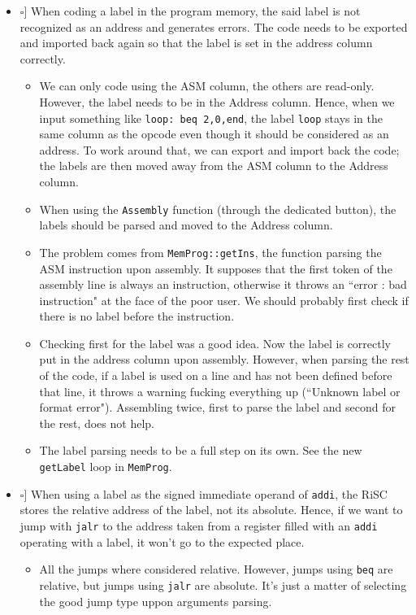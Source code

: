 \documentclass[12pt,a4paper]{extarticle}
\newcommand{\done}{\makebox[0pt][l]{$\square$}\raisebox{.15ex}{\hspace{0.1em}$\checkmark$}}%
\begin{document}
\begin{itemize}
  \item[\done] When coding a label in the program memory, the said label is not recognized as an address and generates errors.
  The code needs to be exported and imported back again so that the label is set in the address column correctly.
  \begin{itemize}
    \item We can only code using the ASM column, the others are read-only.
    However, the label needs to be in the Address column.
    Hence, when we input something like \texttt{loop: beq 2,0,end}, the label \texttt{loop} stays in the same column as the opcode even though it should be considered as an address.
    To work around that, we can export and import back the code; the labels are then moved away from the ASM column to the Address column.
    \item When using the \texttt{Assembly} function (through the dedicated button), the labels should be parsed and moved to the Address column.
    \item The problem comes from \texttt{MemProg::getIns}, the function parsing the ASM instruction upon assembly.
    It supposes that the first token of the assembly line is always an instruction, otherwise it throws an ``error : bad instruction" at the face of the poor user.
    We should probably first check if there is no label before the instruction.
    \item Checking first for the label was a good idea.
    Now the label is correctly put in the address column upon assembly.
    However, when parsing the rest of the code, if a label is used on a line and has not been defined before that line, it throws a warning fucking everything up (``Unknown label or format error").
    Assembling twice, first to parse the label and second for the rest, does not help.
    \item The label parsing needs to be a full step on its own.
    See the new \texttt{getLabel} loop in \texttt{MemProg}.
  \end{itemize}

  \item[\done] When using a label as the signed immediate operand of \texttt{addi}, the RiSC stores the relative address of the label, not its absolute.
  Hence, if we want to jump with \texttt{jalr} to the address taken from a register filled with an \texttt{addi} operating with a label, it won't go to the expected place.
  \begin{itemize}
    \item All the jumps where considered relative.
    However, jumps using \texttt{beq} are relative, but jumps using \texttt{jalr} are absolute.
    It's just a matter of selecting the good jump type uppon arguments parsing.
  \end{itemize}

\end{itemize}
\end{document}
